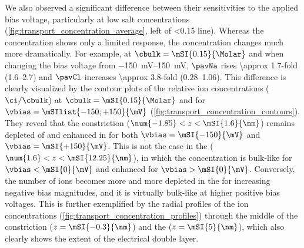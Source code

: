 We also observed a significant difference between their sensitivities to the applied bias voltage,
particularly at low salt concentrations (\cref{fig:transport_concentration_average}, left of
\SI{<0.15}{\Molar} line). Whereas the \Na{} concentration shows only a limited response, the \Cl{}
concentration changes much more dramatically. For example, at $\cbulk = \mSI{0.15}{\Molar}$ and when changing
the bias voltage from \SIrange{-150}{+150}{\mV}, $\pavNa$ rises \num{\approx 1.7}-fold (\numrange{1.6}{2.7})
and $\pavCl$ increases \num{\approx 3.8}-fold (\numrange{0.28}{1.06}). This difference is clearly visualized
by the contour plots of the relative ion concentrations ($\ci/\cbulk$) at $\cbulk = \mSI{0.15}{\Molar}$ and
for $\vbias = \mSIlist{-150;+150}{\mV}$ (\cref{fig:transport_concentration_contours}). They reveal that the
\transi{} constriction ($\num{-1.85} < z < \mSI{1.6}{\nm}$) remains depleted of \Cl{} and enhanced in \Na{}
for both $\vbias = \mSI{-150}{\mV}$ and $\vbias = \mSI{+150}{\mV}$. This is not the case in the \lumen{}
($\num{1.6} < z < \mSI{12.25}{\nm}$), in which the \Na{} concentration is bulk-like for $\vbias <
\mSI{0}{\mV}$ and enhanced for $\vbias > \mSI{0}{\mV}$. Conversely, the number of \Cl{} ions becomes more and
more depleted in the \lumen{} for increasing negative bias magnitudes, and it is virtually bulk-like at higher
positive bias voltages. This is further exemplified by the radial profiles of the ion concentrations
(\cref{fig:transport_concentration_profiles}) through the middle of the constriction ($z = \mSI{-0.3}{\nm}$)
and the \lumen{} ($ z = \mSI{5}{\nm}$), which also clearly shows the extent of the electrical double layer.

